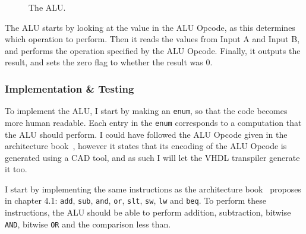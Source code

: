 \begin{figure}
    \centering
    \caption{The ALU.}
    \label{fig:alu}
\end{figure}


The ALU starts by looking at the value in the ALU Opcode, as this determines
which operation to perform. Then it reads the values from Input A and Input B,
and performs the operation specified by the ALU Opcode. Finally, it outputs the
result, and sets the zero flag to whether the result was 0.

\subsubsection*{Implementation \& Testing}
To implement the ALU, I start by making an \texttt{enum}, so that the code
becomes more human readable. Each entry in the \texttt{enum} corresponds to a
computation that the ALU should perform. I could have followed the ALU Opcode
given in the architecture book~\cite{ref:ark}, however it states that its
encoding of the ALU Opcode is generated using a CAD tool, and as such I will
let the VHDL transpiler generate it too.

I start by implementing the same instructions as the architecture
book~\cite{ref:ark} proposes in chapter 4.1: \texttt{add}, \texttt{sub},
\texttt{and}, \texttt{or}, \texttt{slt}, \texttt{sw}, \texttt{lw} and
\texttt{beq}. To perform these instructions, the ALU should be able to perform
addition, subtraction, bitwise \texttt{AND}, bitwise \texttt{OR} and the
comparison less than.


